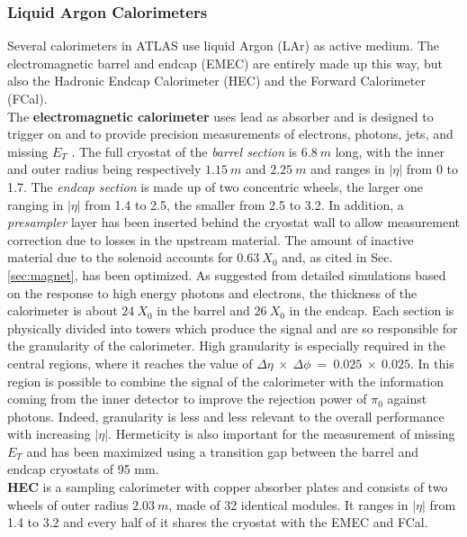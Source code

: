 \documentclass[a4paper,12pt]{article}
\begin{document}
\subsubsection{Liquid Argon Calorimeters}\label{sec:LAr}
Several calorimeters in ATLAS use liquid Argon (LAr) as active medium\cite{current_ELCal}. The electromagnetic barrel and endcap (EMEC) are entirely made up this way, but also the Hadronic Endcap Calorimeter (HEC) and the Forward Calorimeter (FCal). \\[2pt]
The \textbf{electromagnetic calorimeter} uses lead as absorber and is designed to trigger on and to provide precision measurements of electrons, photons, jets, and missing $E_T$ .
The full cryostat of the \textit{barrel section} is $6.8\ m$ long, with the inner and outer radius being respectively $1.15\ m$ and $2.25\ m$ and ranges in $|\eta|$ from 0 to 1.7.  The \textit{endcap section} is made up of two concentric wheels, the larger one ranging in $|\eta|$ from 1.4 to 2.5, the smaller from 2.5 to 3.2. In addition, a \textit{presampler} layer has been inserted behind the cryostat wall to allow measurement correction due to losses in the upstream material. The amount of inactive material due to the solenoid
accounts for $0.63\ X_0$ and, as cited in Sec.\ref{sec:magnet}, has been optimized. As suggested from detailed simulations based on the response to high energy photons and electrons, the thickness of the calorimeter is about $24\ X_0$ in the barrel and $26\ X_0$ in the endcap. Each section is physically divided into towers which produce the signal and are so responsible
for the granularity of the calorimeter.
High granularity is especially required in the central regions, where it reaches the value of 
$\Delta\eta\ \times\ \Delta\phi\ =\ 0.025\ \times\ 0.025$. In this region is possible to combine the signal of the calorimeter with the information coming from the inner detector to improve the rejection power of $\pi_0$ against photons. Indeed, granularity is less and less relevant to the overall performance with increasing $|\eta|$. Hermeticity is also important for the measurement of missing $E_T$ and has been maximized using a transition gap between the barrel and endcap cryostats of 95 mm. \\[2pt]

\textbf{HEC}\cite{hec} is a sampling calorimeter with copper absorber plates and consists of two wheels of outer radius $2.03\ m$, made of 32 identical modules. It ranges in $|\eta|$ from 1.4 to 3.2 and every half of it shares the cryostat with the EMEC and FCal. \\[2pt]
\end{document}
